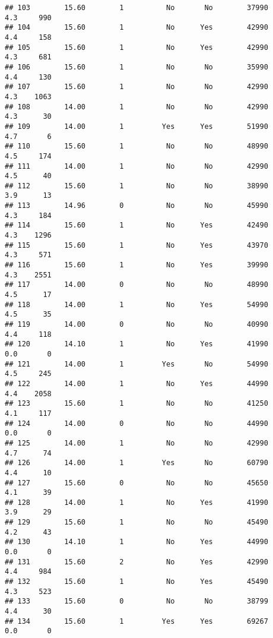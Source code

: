 \documentclass[
]{article}
\begin{document}
\begin{verbatim}
## 103        15.60        1          No       No        37990         4.3     990
## 104        15.60        1          No      Yes        42990         4.4     158
## 105        15.60        1          No      Yes        42990         4.3     681
## 106        15.60        1          No       No        35990         4.4     130
## 107        15.60        1          No       No        42990         4.3    1063
## 108        14.00        1          No       No        42990         4.3      30
## 109        14.00        1         Yes      Yes        51990         4.7       6
## 110        15.60        1          No       No        48990         4.5     174
## 111        14.00        1          No       No        42990         4.5      40
## 112        15.60        1          No       No        38990         3.9      13
## 113        14.96        0          No       No        45990         4.3     184
## 114        15.60        1          No      Yes        42490         4.3    1296
## 115        15.60        1          No      Yes        43970         4.3     571
## 116        15.60        1          No      Yes        39990         4.3    2551
## 117        14.00        0          No       No        48990         4.5      17
## 118        14.00        1          No      Yes        54990         4.5      35
## 119        14.00        0          No       No        40990         4.4     118
## 120        14.10        1          No      Yes        41990         0.0       0
## 121        14.00        1         Yes       No        54990         4.5     245
## 122        14.00        1          No      Yes        44990         4.4    2058
## 123        15.60        1          No       No        41250         4.1     117
## 124        14.00        0          No       No        44990         0.0       0
## 125        14.00        1          No       No        42990         4.7      74
## 126        14.00        1         Yes       No        60790         4.4      10
## 127        15.60        0          No       No        45650         4.1      39
## 128        14.00        1          No      Yes        41990         3.9      29
## 129        15.60        1          No       No        45490         4.2      43
## 130        14.10        1          No      Yes        44990         0.0       0
## 131        15.60        2          No      Yes        42990         4.4     984
## 132        15.60        1          No      Yes        45490         4.3     523
## 133        15.60        0          No       No        38799         4.4      30
## 134        15.60        1         Yes      Yes        69267         0.0       0

\end{verbatim}
\end{document}
